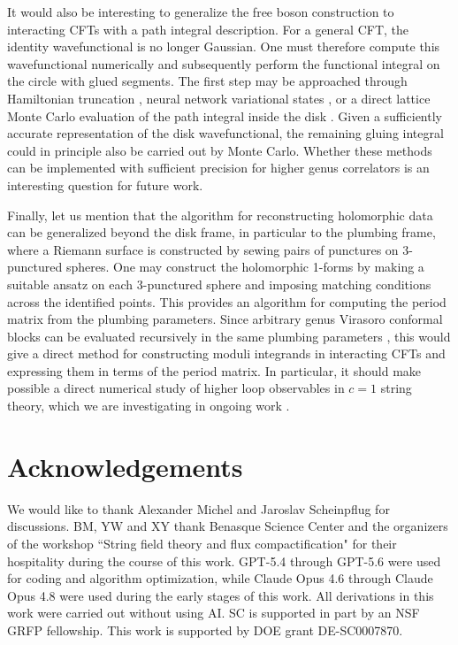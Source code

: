 \documentclass[12pt]{article}
\numberwithin{equation}{section}
\begin{document}
It would also be interesting to generalize the free boson construction to interacting CFTs with a path integral description. For a general CFT, the identity wavefunctional is no longer Gaussian. One must therefore compute this wavefunctional numerically and subsequently perform the functional integral on the circle with glued segments. The first step may be approached through Hamiltonian truncation \cite{RychkovVitale:2015}, neural network variational states \cite{CarleoTroyer:2017,MartynNajafiLuo:2023}, or a direct lattice Monte Carlo evaluation of the path integral inside the disk \cite{BrowerFlemingNeuberger:2013}. Given a sufficiently accurate representation of the disk wavefunctional, the remaining gluing integral could in principle also be carried out by Monte Carlo. Whether these methods can be implemented with sufficient precision for higher genus correlators is an interesting question for future work.

Finally, let us mention that the algorithm for reconstructing holomorphic data can be generalized beyond the disk frame, in particular to the plumbing frame, where a Riemann surface is constructed by sewing pairs of punctures on 3-punctured spheres. One may construct the holomorphic 1-forms by making a suitable ansatz on each 3-punctured sphere and imposing matching conditions across the identified points. This provides an algorithm for computing the period matrix from the plumbing parameters. Since arbitrary genus Virasoro conformal blocks can be evaluated recursively in the same plumbing parameters \cite{Cho-Collier-Yin}, this would give a direct method for constructing moduli integrands in interacting CFTs and expressing them in terms of the period matrix. In particular, it should make possible a direct numerical study of higher loop observables in $c=1$ string theory, which we are investigating in ongoing work \cite{c1paper}.

\section*{Acknowledgements}

We would like to thank Alexander Michel and Jaroslav Scheinpflug for discussions. BM, YW and XY thank Benasque Science Center and the organizers of the workshop ``String field theory and flux compactification" for their hospitality during the course of this work. GPT-5.4 through GPT-5.6 were used for coding and algorithm optimization, while Claude Opus 4.6 through Claude Opus 4.8 were used during the early stages of this work. All derivations in this work were carried out without using AI. SC is supported in part by an NSF GRFP fellowship. This work is supported by DOE grant DE-SC0007870.
\end{document}
